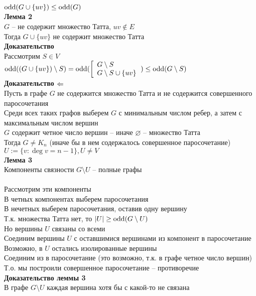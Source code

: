 \documentclass[12pt]{article}
\begin{document}
$\operatorname{odd}(G\cup \{uv\}) \leq \operatorname{odd}(G)$\\
\textbf{Лемма 2}\\
$G$ -- не содержит множество Татта, $uv\not\in E$\\
Тогда $G \cup \{uv\}$ не содержит множество Татта\\
\textbf{Доказательство}\\
Рассмотрим $S \in V$\\
$\operatorname{odd}((G\cup \{uv\})\setminus S) = \operatorname{odd}(\left[\begin{array}{ll}
    G\setminus S\\
    G\setminus S \cup \{uv\}
\end{array}\right.) \leq \operatorname{odd}(G\setminus S)$\\
\textbf{Доказательство $\Leftarrow$}\\
Пусть в графе $G$ не содержится множество Татта и не содержится совершенного паросочетания\\
Среди всех таких графов выберем $G$ с минимальным числом ребер, а затем с максимальным числом вершин\\
$G$ содержит четное число вершин -- иначе $\varnothing$ -- множество Татта\\
Тогда $G \neq K_n$ (иначе бы в нем содержалось совершенное паросочетание)\\
$U:=\{v: \deg v = n-1\}, U \neq V$\\
\textbf{Лемма 3}\\
Компоненты связности $G\setminus U$ -- полные графы\\\\
Рассмотрим эти компоненты\\
В четных компонентах выберем паросочетания\\
В нечетных выберем паросочетания, оставив одну вершину\\
Т.к. множества Татта нет, то $|U| \geq \operatorname{odd}(G\setminus U)$\\
Но вершины $U$ связаны со всеми\\
Соединим вершины $U$ с оставшимися вершинами из компонент в паросочетание\\
Возможно, в $U$ остались изолированные вершины\\
Соединим из в паросочетание (это возможно, т.к. в графе четное число вершин)\\
Т.о. мы построили совершенное паросочетание -- противоречие\\
\textbf{Доказательство леммы 3}\\
В графе $G\setminus U$ каждая вершина хотя бы с какой-то не связана\\
\end{document}
